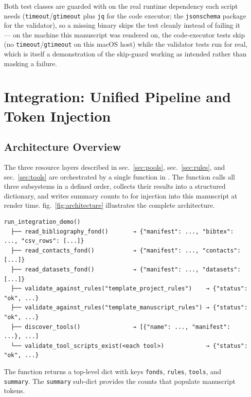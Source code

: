 \documentclass[
]{article}
\begin{document}
Both test classes are guarded with  on the
real runtime dependency each script needs
(\texttt{timeout}/\texttt{gtimeout} plus \texttt{jq} for the code
executor; the \texttt{jsonschema} package for the validator), so a
missing binary skips the test cleanly instead of failing it --- on the
machine this manuscript was rendered on, the code-executor tests skip
(no \texttt{timeout}/\texttt{gtimeout} on this macOS host) while the
validator tests run for real, which is itself a demonstration of the
skip-guard working as intended rather than masking a failure.

\newpage

\section{Integration: Unified Pipeline and Token
Injection}\label{sec:integration}

\subsection{Architecture Overview}\label{architecture-overview}

The three resource layers described in sec.~\ref{sec:pools},
sec.~\ref{sec:rules}, and sec.~\ref{sec:tools} are orchestrated by a
single function in . The
 function calls all three subsystems in
a defined order, collects their results into a structured dictionary,
and writes summary counts to
 for injection into this
manuscript at render time. fig.~\ref{fig:architecture} illustrates the
complete architecture.

\begin{verbatim}
run_integration_demo()
  ├── read_bibliography_fond()       → {"manifest": ..., "bibtex": ..., "csv_rows": [...]}
  ├── read_contacts_fond()           → {"manifest": ..., "contacts": [...]}
  ├── read_datasets_fond()           → {"manifest": ..., "datasets": [...]}
  ├── validate_against_rules("template_project_rules")    → {"status": "ok", ...}
  ├── validate_against_rules("template_manuscript_rules") → {"status": "ok", ...}
  ├── discover_tools()               → [{"name": ..., "manifest": ...}, ...]
  └── validate_tool_scripts_exist(<each tool>)            → {"status": "ok", ...}
\end{verbatim}

The function returns a top-level dict with keys \texttt{fonds},
\texttt{rules}, \texttt{tools}, and \texttt{summary}. The
\texttt{summary} sub-dict provides the counts that populate manuscript
tokens.
\end{document}
